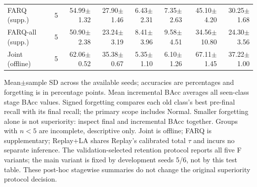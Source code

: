 \begin{table}[t]
\begin{tabular}{lrrrrrrr}
FARQ (supp.) & 5 & 54.99$\pm$1.32 & 27.90$\pm$1.46 & 6.43$\pm$2.31 & 7.35$\pm$2.63 & 45.10$\pm$4.20 & 30.25$\pm$1.68 \\
FARQ-all (supp.) & 5 & 50.90$\pm$2.38 & 23.24$\pm$3.19 & 8.41$\pm$3.96 & 9.58$\pm$4.51 & 34.56$\pm$10.80 & 24.30$\pm$3.56 \\
Joint (offline) & 5 & 62.06$\pm$0.52 & 35.38$\pm$0.67 & 5.35$\pm$1.10 & 6.10$\pm$1.26 & 67.11$\pm$1.45 & 37.22$\pm$1.00 \\
\bottomrule
\end{tabular}
\par\smallskip\begin{minipage}{0.98\textwidth}\scriptsize Mean$\pm$sample SD across the available seeds; accuracies are percentages and forgetting is in percentage points. Mean incremental BAcc averages all seen-class stage BAcc values. Signed forgetting compares each old class's best pre-final recall with its final recall; the primary scope includes Normal. Smaller forgetting alone is not superiority: inspect final and incremental BAcc together. Groups with $n<5$ are incomplete, descriptive only. Joint is offline; FARQ is supplementary; Replay+LA shares Replay's calibrated total $\tau$ and incurs no separate inference. The validation-selected retention protocol reports all five F variants; the main variant is fixed by development seeds 5/6, not by this test table. These post-hoc stagewise summaries do not change the original superiority protocol decision.\end{minipage}
\end{table}


